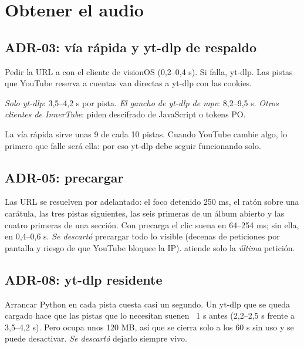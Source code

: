 \section{Obtener el audio}

\subsection{ADR-03: vía rápida y yt-dlp de respaldo}

\begin{description}[style=nextline, leftmargin=0pt]
  \item[Se eligió] Pedir la URL a  con el cliente de visionOS (0,2--0,4 s). Si
  falla, yt-dlp. Las pistas que YouTube reserva a cuentas van directas a yt-dlp con las
  cookies.
  \item[Se descartó] \emph{Solo yt-dlp}: 3,5--4,2 s por pista. \emph{El gancho de yt-dlp de
  mpv}: 8,2--9,5 s. \emph{Otros clientes de InnerTube}: piden descifrado de JavaScript o
  tokens PO.
  \item[Consecuencia] La vía rápida sirve unas 9 de cada 10 pistas. Cuando YouTube cambie algo,
  lo primero que falle será ella: por eso yt-dlp debe seguir funcionando solo.
\end{description}

\subsection{ADR-05: precargar}

Las URL se resuelven por adelantado: el foco detenido 250 ms, el ratón sobre una carátula, las
tres pistas siguientes, las seis primeras de un álbum abierto y las cuatro primeras de una
sección. Con precarga el clic suena en 64--254 ms; sin ella, en 0,4--0,6 s.
\emph{Se descartó} precargar todo lo visible (decenas de peticiones por pantalla y riesgo de
que YouTube bloquee la IP).  atiende solo la \emph{última} petición.

\subsection{ADR-08: yt-dlp residente}

Arrancar Python en cada pista cuesta casi un segundo. Un yt-dlp que se queda cargado hace que
las pistas que lo necesitan suenen ~1 s antes (2,2--2,5 s frente a 3,5--4,2 s). Pero ocupa
unos 120 MB, así que se cierra solo a los 60 s sin uso y se puede desactivar. \emph{Se
descartó} dejarlo siempre vivo.

